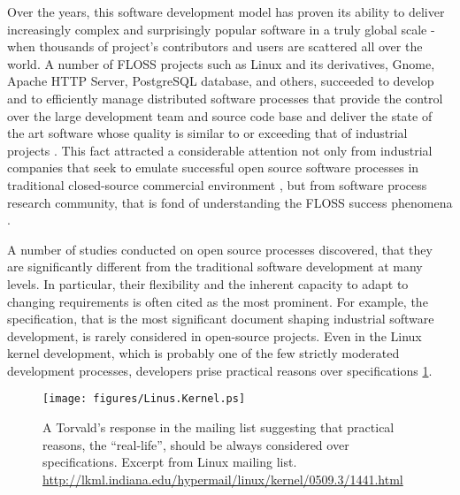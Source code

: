 Over the years, this software development model has proven its ability to deliver increasingly complex 
and surprisingly popular software in a truly global scale - when thousands of project's contributors 
and users are scattered all over the world. A number of FLOSS projects such as Linux and its 
derivatives, Gnome, Apache HTTP Server, PostgreSQL database, and others, succeeded to develop and to 
efficiently manage distributed software processes that provide the control over the large development 
team and source code base and deliver the state of the art software whose quality is similar to or 
exceeding that of industrial projects \cite{coverity2012}. 
This fact attracted a considerable attention not only from industrial companies that seek to emulate 
successful open source software processes in traditional closed-source commercial environment 
\cite{oss_virtual_organizations} \cite{oss_balance} \cite{oss_hp} \cite{oss_4industry}, 
but from software process research community, that is fond of understanding the FLOSS success phenomena
\cite{citeulike:12550640} \cite{citeulike:5043664} \cite{citeulike:5128808} \cite{citeulike:10377366}.


A number of studies conducted on open source processes discovered, that they are significantly 
different from the traditional software development at many levels. 
In particular, their flexibility and the inherent capacity to adapt to changing requirements is often cited as 
the most prominent. 
For example, the specification, that is the most significant document shaping industrial software development,
is rarely considered in open-source projects. Even in the Linux kernel development, which is probably one of 
the few strictly moderated development processes, developers prise practical reasons over specifications \ref{fig:kernel}.

\begin{figure}[ht!]
   \centering
   \texttt{[image: figures/Linus.Kernel.ps]}
   \caption{A Torvald's response in the mailing list suggesting that practical reasons, the ``real-life'', 
   should be always considered over specifications.
   Excerpt from Linux mailing list. \url{http://lkml.indiana.edu/hypermail/linux/kernel/0509.3/1441.html}}
   \label{fig:kernel}
\end{figure}

